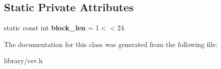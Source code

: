 \subsection*{Static Private Attributes}
\begin{DoxyCompactItemize}
\item 
\mbox{\label{classio_1_1LineReader_a04db9ad3b956347b48136dbe5751469d}} 
static const int {\bfseries block\+\_\+len} = 1$<$$<$24
\end{DoxyCompactItemize}


The documentation for this class was generated from the following file\+:\begin{DoxyCompactItemize}
\item 
library/csv.\+h\end{DoxyCompactItemize}
